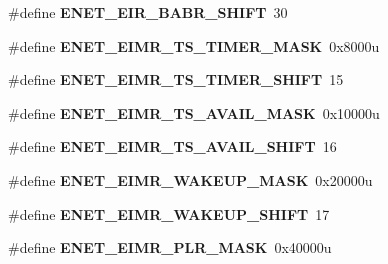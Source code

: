 \begin{DoxyCompactItemize}
\item 
\#define {\bfseries E\+N\+E\+T\+\_\+\+E\+I\+R\+\_\+\+B\+A\+B\+R\+\_\+\+S\+H\+I\+FT}~30\hypertarget{group__ENET__Register__Masks_gabde85bd2d6099ccd0d7b5a48b648a3b2}{}\label{group__ENET__Register__Masks_gabde85bd2d6099ccd0d7b5a48b648a3b2}

\item 
\#define {\bfseries E\+N\+E\+T\+\_\+\+E\+I\+M\+R\+\_\+\+T\+S\+\_\+\+T\+I\+M\+E\+R\+\_\+\+M\+A\+SK}~0x8000u\hypertarget{group__ENET__Register__Masks_gaf036db440c529ff6fefcb0117db93840}{}\label{group__ENET__Register__Masks_gaf036db440c529ff6fefcb0117db93840}

\item 
\#define {\bfseries E\+N\+E\+T\+\_\+\+E\+I\+M\+R\+\_\+\+T\+S\+\_\+\+T\+I\+M\+E\+R\+\_\+\+S\+H\+I\+FT}~15\hypertarget{group__ENET__Register__Masks_ga3ae1d93529feddafe084f0c4709758b1}{}\label{group__ENET__Register__Masks_ga3ae1d93529feddafe084f0c4709758b1}

\item 
\#define {\bfseries E\+N\+E\+T\+\_\+\+E\+I\+M\+R\+\_\+\+T\+S\+\_\+\+A\+V\+A\+I\+L\+\_\+\+M\+A\+SK}~0x10000u\hypertarget{group__ENET__Register__Masks_gadb2e7c3e600fe3ea3694c9ebf8460f93}{}\label{group__ENET__Register__Masks_gadb2e7c3e600fe3ea3694c9ebf8460f93}

\item 
\#define {\bfseries E\+N\+E\+T\+\_\+\+E\+I\+M\+R\+\_\+\+T\+S\+\_\+\+A\+V\+A\+I\+L\+\_\+\+S\+H\+I\+FT}~16\hypertarget{group__ENET__Register__Masks_ga7af0adce91f65d4127770cbea42a00e7}{}\label{group__ENET__Register__Masks_ga7af0adce91f65d4127770cbea42a00e7}

\item 
\#define {\bfseries E\+N\+E\+T\+\_\+\+E\+I\+M\+R\+\_\+\+W\+A\+K\+E\+U\+P\+\_\+\+M\+A\+SK}~0x20000u\hypertarget{group__ENET__Register__Masks_ga5a8c25f893ae181e80d0be797b4629f3}{}\label{group__ENET__Register__Masks_ga5a8c25f893ae181e80d0be797b4629f3}

\item 
\#define {\bfseries E\+N\+E\+T\+\_\+\+E\+I\+M\+R\+\_\+\+W\+A\+K\+E\+U\+P\+\_\+\+S\+H\+I\+FT}~17\hypertarget{group__ENET__Register__Masks_ga1a9b8710bbb85a58d145dc2b9ad55499}{}\label{group__ENET__Register__Masks_ga1a9b8710bbb85a58d145dc2b9ad55499}

\item 
\#define {\bfseries E\+N\+E\+T\+\_\+\+E\+I\+M\+R\+\_\+\+P\+L\+R\+\_\+\+M\+A\+SK}~0x40000u\hypertarget{group__ENET__Register__Masks_ga87222507fb9ff6ab830bc2547170ec28}{}\label{group__ENET__Register__Masks_ga87222507fb9ff6ab830bc2547170ec28}


\end{DoxyCompactItemize}

